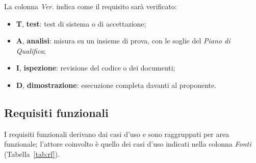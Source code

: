 \documentclass[documento]{gpt}
\begin{document}
La colonna \textit{Ver.} indica come il requisito sarà verificato:
\begin{itemize}
  \item \textbf{T}, \textbf{test}: test di sistema o di accettazione;
  \item \textbf{A}, \textbf{analisi}: misura su un insieme di prova, con le soglie
        del \textit{Piano di Qualifica};
  \item \textbf{I}, \textbf{ispezione}: revisione del codice o dei documenti;
  \item \textbf{D}, \textbf{dimostrazione}: esecuzione completa davanti al
        proponente.
\end{itemize}

\subsection{Requisiti funzionali}\label{sec:rf}

I requisiti funzionali derivano dai casi d'uso e sono raggruppati per area
funzionale; l'attore coinvolto è quello dei casi d'uso indicati nella colonna
\textit{Fonti} (Tabella~\ref{tab:rf}).
\end{document}
